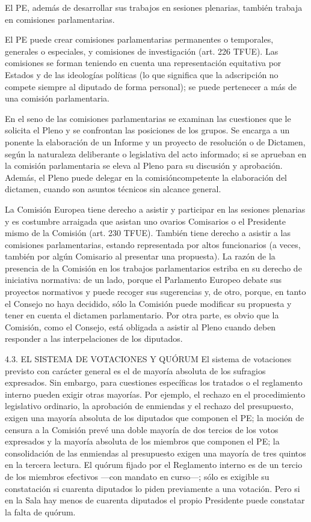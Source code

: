 \documentclass[10pt,a4paper]{article}
\begin{document}
El PE, además de desarrollar sus trabajos en sesiones plenarias, también trabaja en comisiones parlamentarias.

El PE puede crear comisiones parlamentarias permanentes o temporales, generales o especiales, y comisiones de investigación (art. 226 TFUE). Las comisiones se forman teniendo en cuenta una representación equitativa por Estados y de las ideologías políticas (lo que significa que la adscripción no compete siempre al diputado de forma personal); se puede pertenecer a más de una comisión parlamentaria. 

En el seno de las comisiones parlamentarias se examinan las cuestiones que le solicita el Pleno y se confrontan las posiciones de los grupos. Se encarga a un ponente la elaboración de un Informe y un proyecto de resolución o de Dictamen, según la naturaleza deliberante o legislativa del acto informado; si se aprueban en la comisión parlamentaria se eleva al Pleno para su discusión y aprobación. Además, el Pleno puede delegar en la comisióncompetente la elaboración del dictamen, cuando son asuntos técnicos sin alcance general.

La Comisión Europea tiene derecho a asistir y participar en las sesiones plenarias y es costumbre arraigada que asistan uno ovarios Comisarios o el Presidente mismo de la Comisión (art. 230 TFUE). También tiene derecho a asistir a las comisiones parlamentarias, estando representada por altos funcionarios (a veces, también por algún Comisario al presentar una propuesta). La razón de la presencia de la Comisión en los trabajos parlamentarios estriba en su derecho de iniciativa normativa: de un lado, porque el Parlamento Europeo debate sus proyectos normativos y puede recoger sus sugerencias y, de otro, porque, en tanto el Consejo no haya decidido, sólo la Comisión puede modificar su propuesta y tener en cuenta el dictamen parlamentario. Por otra parte, es obvio que la Comisión, como el Consejo, está obligada a asistir al Pleno cuando deben responder a las interpelaciones de los diputados.


4.3. EL SISTEMA DE VOTACIONES Y QUÓRUM
El sistema de votaciones previsto con carácter general es el de mayoría absoluta de los sufragios expresados. Sin embargo, para cuestiones específicas los tratados o el reglamento interno pueden exigir otras mayorías. Por ejemplo, el rechazo en el procedimiento legislativo ordinario, la aprobación de enmiendas y el rechazo del presupuesto, exigen una mayoría absoluta de los diputados que componen el PE; la moción de censura a la Comisión prevé una doble mayoría de dos tercios de los votos expresados y la mayoría absoluta de los miembros que componen el PE; la consolidación de las enmiendas al presupuesto exigen una mayoría de tres quintos en la tercera lectura. El quórum fijado por el Reglamento interno es de un tercio de los miembros efectivos —con mandato en curso—; sólo es exigible su constatación si cuarenta diputados lo piden previamente a una votación. Pero si en la Sala hay menos de cuarenta diputados el propio Presidente puede constatar la falta de quórum.
\end{document}
